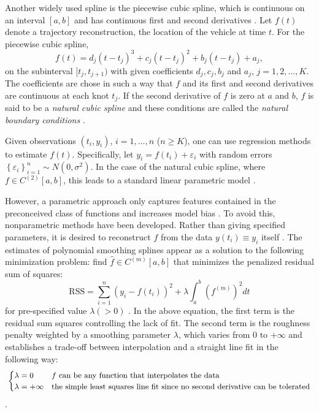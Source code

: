 Another widely used spline is the piecewise cubic spline, which is continuous on an interval $[a,b]$ and has continuous first and second derivatives \citep{wolberg1988cubic}. Let $f(t)$ denote a trajectory reconstruction, \ie the location of the vehicle at time $t$. For the piecewise cubic spline,  
\begin{equation*}
f(t)=d_j(t-t_j)^3+c_j(t-t_j)^2+b_j(t-t_j)+a_j,
\end{equation*}
on the subinterval $[t_j,t_{j+1})$ with given coefficients $d_j, c_j, b_j$ and $a_j$, $j=1,2,\ldots,K$. The coefficients are chose in such a way that $f$ and its first and second derivatives are continuous at each knot $t_j$. If the second derivative of $f$ is zero at $a$ and $b$, $f$ is said to be a \textit{natural cubic spline} and these conditions are called the \textit{natural boundary conditions}  \citep{green1993nonparametric}. 


Given observations $\left(t_i,y_i\right)$, $i=1,\ldots,n$ ($n\geq K$), one can use regression methods to estimate $f(t)$. Specifically, let $y_i=f(t_i)+\varepsilon_i$ with random errors $\left\lbrace \varepsilon_i\right\rbrace_{i=1}^n \sim N\left(0,\sigma^2\right)$. In the case of the natural cubic spline, where $f\in \mathit{C}^{(2)}[a,b]$, this leads to a standard linear parametric model \citep{kim2004smoothing}. 


However, a parametric approach only captures features contained in the preconceived class of functions and increases model bias \citep{yao2005functional}. To avoid this, nonparametric methods have been developed. Rather than giving specified parameters, it is desired to reconstruct $f$ from the data $y(t_i)\equiv y_i$ itself  \citep{craven1978smoothing}. The estimates of polynomial smoothing splines appear as a solution to the following minimization problem: find $\hat{f} \in \mathit{C}^{(m)}[a,b]$ that minimizes the penalized residual sum of squares: 
\begin{equation}\label{introSmoothingOb}
\mbox{RSS}=\sum_{i=1}^{n}\left(y_i-f(t_i)\right)^2+\lambda\int_a^b \left(f^{(m)}\right)^2 dt
\end{equation}
for pre-specified value $\lambda(>0)$ \citep{aydin2012smoothing}. In the above equation, the first term is the residual sum squares controlling the lack of fit. The second term is the roughness penalty weighted by a smoothing parameter $\lambda$, which varies from $0$ to $+\infty$ and establishes a trade-off between interpolation and a  straight line fit in the following way: 
\begin{align*}\small 
\begin{cases}
\lambda = 0  & \mbox{$f$ can be any function that interpolates the data}\\
\lambda = +\infty & \mbox{the simple least squares line fit since no second derivative can be tolerated}
\end{cases}
\end{align*}\citep{esl2009}. 

